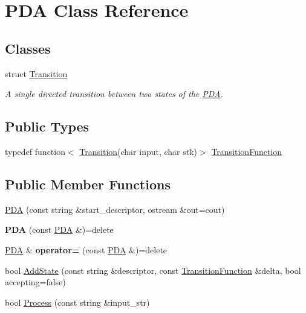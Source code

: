 \hypertarget{classPDA}{}\section{P\+DA Class Reference}
\label{classPDA}
\subsection*{Classes}
\begin{DoxyCompactItemize}
\item 
struct \hyperlink{structPDA_1_1Transition}{Transition}
\begin{DoxyCompactList}\small\item\em A single directed transition between two states of the \hyperlink{classPDA}{P\+DA}. \end{DoxyCompactList}\end{DoxyCompactItemize}
\subsection*{Public Types}
\begin{DoxyCompactItemize}
\item 
typedef function$<$ \hyperlink{structPDA_1_1Transition}{Transition}(char input, char stk)$>$ \hyperlink{classPDA_a4f001a9e4d59473ff532a7f0bfe726d7}{Transition\+Function}
\end{DoxyCompactItemize}
\subsection*{Public Member Functions}
\begin{DoxyCompactItemize}
\item 
\hyperlink{classPDA_a173e167cfd9ed03e714b076429c170ee}{P\+DA} (const string \&start\+\_\+descriptor, ostream \&out=cout)
\item 
{\bfseries P\+DA} (const \hyperlink{classPDA}{P\+DA} \&)=delete\hypertarget{classPDA_a920a380716f99189afbfee960a0bf03b}{}\label{classPDA_a920a380716f99189afbfee960a0bf03b}

\item 
\hyperlink{classPDA}{P\+DA} \& {\bfseries operator=} (const \hyperlink{classPDA}{P\+DA} \&)=delete\hypertarget{classPDA_a92945cb40d972259c818a675671e80d0}{}\label{classPDA_a92945cb40d972259c818a675671e80d0}

\item 
bool \hyperlink{classPDA_a43043f07515e3ab3fb13b77bc3076878}{Add\+State} (const string \&descriptor, const \hyperlink{classPDA_a4f001a9e4d59473ff532a7f0bfe726d7}{Transition\+Function} \&delta, bool accepting=false)
\item 
bool \hyperlink{classPDA_aa1cc23df562955796911837ad263b08a}{Process} (const string \&input\+\_\+str)
\end{DoxyCompactItemize}
